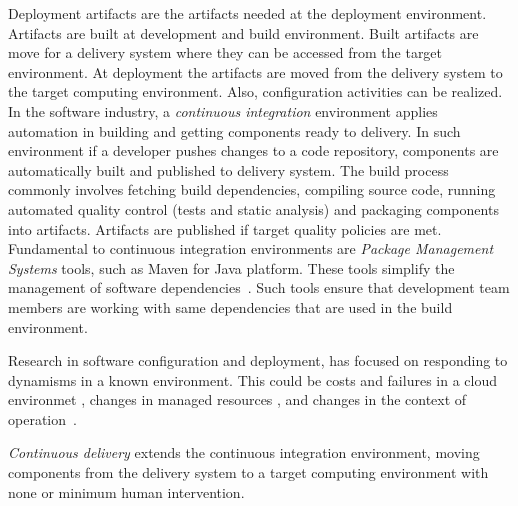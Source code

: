 Deployment artifacts are the artifacts needed at the deployment environment. Artifacts are built at development and build environment. Built artifacts are move for a delivery system where they can be accessed from the target environment. At deployment the artifacts are moved from the delivery system to the target computing environment. Also, configuration activities can be realized.
In the software industry, a \emph{continuous integration}\cite{humble_continuous_2010} environment applies automation in building and getting components ready to delivery. In such environment if a developer pushes changes to a code repository, components are automatically built and published to delivery system. The build process commonly involves fetching build dependencies, compiling source code, running automated quality control (tests and static analysis) and packaging components into artifacts. Artifacts are published if target quality policies are met.
Fundamental to continuous integration environments are \emph{Package Management Systems} tools, such as Maven\cite{apache_apache_2016} for Java platform. These tools simplify the management of software dependencies~\cite{spinellis_package_2012}. Such tools ensure that development team members are working with same dependencies that are used in the build environment.

Research in software configuration and deployment, has focused on responding to dynamisms in a known environment. This could be costs and failures in a cloud environmet \cite{ferreira_leite_user_2014}, changes in managed resources \citep{gunalp_rondo_2015}, and changes in the context of operation~\cite{bencomo_dynamically_2008}.

\emph{Continuous delivery}\cite{humble_continuous_2010} extends the continuous integration environment, moving components from the delivery system to a target computing environment with none or minimum human intervention.

